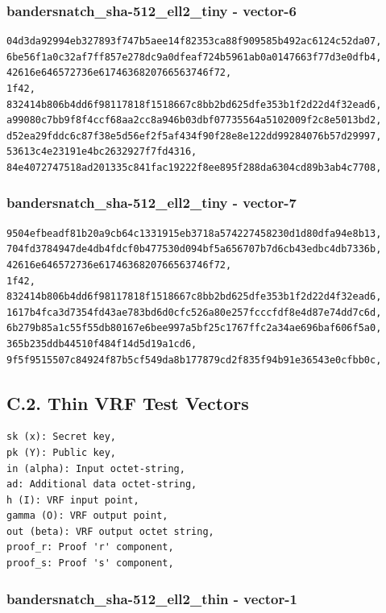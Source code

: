 \documentclass[
]{article}
\begin{document}
\subsubsection{bandersnatch\_sha-512\_ell2\_tiny -
vector-6}\label{bandersnatch_sha-512_ell2_tiny---vector-6}

\begin{verbatim}
04d3da92994eb327893f747b5aee14f82353ca88f909585b492ac6124c52da07,
6be56f1a0c32af7ff857e278dc9a0dfeaf724b5961ab0a0147663f77d3e0dfb4,
42616e646572736e6174636820766563746f72,
1f42,
832414b806b4dd6f98117818f1518667c8bb2bd625dfe353b1f2d22d4f32ead6,
a99080c7bb9f8f4ccf68aa2cc8a946b03dbf07735564a5102009f2c8e5013bd2,
d52ea29fddc6c87f38e5d56ef2f5af434f90f28e8e122dd99284076b57d29997,
53613c4e23191e4bc2632927f7fd4316,
84e4072747518ad201335c841fac19222f8ee895f288da6304cd89b3ab4c7708,
\end{verbatim}

\subsubsection{bandersnatch\_sha-512\_ell2\_tiny -
vector-7}\label{bandersnatch_sha-512_ell2_tiny---vector-7}

\begin{verbatim}
9504efbeadf81b20a9cb64c1331915eb3718a574227458230d1d80dfa94e8b13,
704fd3784947de4db4fdcf0b477530d094bf5a656707b7d6cb43edbc4db7336b,
42616e646572736e6174636820766563746f72,
1f42,
832414b806b4dd6f98117818f1518667c8bb2bd625dfe353b1f2d22d4f32ead6,
1617b4fca3d7354fd43ae783bd6d0cfc526a80e257fcccfdf8e4d87e74dd7c6d,
6b279b85a1c55f55db80167e6bee997a5bf25c1767ffc2a34ae696baf606f5a0,
365b235ddb44510f484f14d5d19a1cd6,
9f5f9515507c84924f87b5cf549da8b177879cd2f835f94b91e36543e0cfbb0c,
\end{verbatim}

\subsection{C.2. Thin VRF Test
Vectors}\label{c.2.-thin-vrf-test-vectors}

\begin{verbatim}
sk (x): Secret key,
pk (Y): Public key,
in (alpha): Input octet-string,
ad: Additional data octet-string,
h (I): VRF input point,
gamma (O): VRF output point,
out (beta): VRF output octet string,
proof_r: Proof 'r' component,
proof_s: Proof 's' component,
\end{verbatim}

\subsubsection{bandersnatch\_sha-512\_ell2\_thin -
vector-1}\label{bandersnatch_sha-512_ell2_thin---vector-1}
\end{document}
